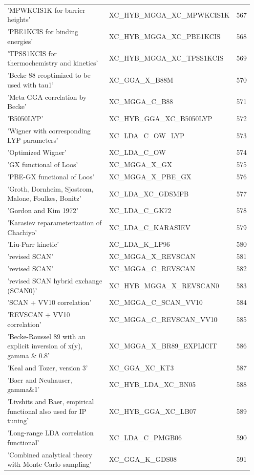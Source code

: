 \documentclass[final,12pt,makeidx,DIV=calc]{article}
\begin{document}
{{{\begin{table}[!h]
\begin{center}
\begin{tabular}{llr}
  'MPWKCIS1K for barrier heights' & XC\_HYB\_MGGA\_XC\_MPWKCIS1K  &567\\
  'PBE1KCIS for binding energies' & XC\_HYB\_MGGA\_XC\_PBE1KCIS  &568\\
  'TPSS1KCIS for thermochemistry and kinetics' & XC\_HYB\_MGGA\_XC\_TPSS1KCIS  &569\\
  'Becke 88 reoptimized to be used with tau1' & XC\_GGA\_X\_B88M  &570\\
  'Meta-GGA correlation by Becke' & XC\_MGGA\_C\_B88  &571\\
  'B5050LYP' & XC\_HYB\_GGA\_XC\_B5050LYP  &572\\
  'Wigner with corresponding LYP parameters' & XC\_LDA\_C\_OW\_LYP  &573\\
  'Optimized Wigner' & XC\_LDA\_C\_OW  &574\\
  'GX functional of Loos' & XC\_MGGA\_X\_GX  &575\\
  'PBE-GX functional of Loos' & XC\_MGGA\_X\_PBE\_GX  &576\\
  'Groth, Dornheim, Sjostrom, Malone, Foulkes, Bonitz' & XC\_LDA\_XC\_GDSMFB  &577\\
  'Gordon and Kim 1972' & XC\_LDA\_C\_GK72  &578\\
  'Karasiev reparameterization of Chachiyo' & XC\_LDA\_C\_KARASIEV  &579\\
  'Liu-Parr kinetic' & XC\_LDA\_K\_LP96  &580\\
  'revised SCAN' & XC\_MGGA\_X\_REVSCAN  &581\\
  'revised SCAN' & XC\_MGGA\_C\_REVSCAN  &582\\
  'revised SCAN hybrid exchange (SCAN0)' & XC\_HYB\_MGGA\_X\_REVSCAN0  &583\\
  'SCAN + VV10 correlation' & XC\_MGGA\_C\_SCAN\_VV10  &584\\
  'REVSCAN + VV10 correlation' & XC\_MGGA\_C\_REVSCAN\_VV10  &585\\
  'Becke-Roussel 89 with an explicit inversion of x(y), gamma \& 0.8' & XC\_MGGA\_X\_BR89\_EXPLICIT  &586\\
  'Keal and Tozer, version 3' & XC\_GGA\_XC\_KT3  &587\\
  'Baer and Neuhauser, gamma\&1' & XC\_HYB\_LDA\_XC\_BN05  &588\\
  'Livshits and Baer, empirical functional also used for IP tuning' & XC\_HYB\_GGA\_XC\_LB07  &589\\
  'Long-range LDA correlation functional' & XC\_LDA\_C\_PMGB06  &590\\
  'Combined analytical theory with Monte Carlo sampling' & XC\_GGA\_K\_GDS08  &591\\

\end{tabular}
\end{center}
\end{table}}}}
\end{document}
